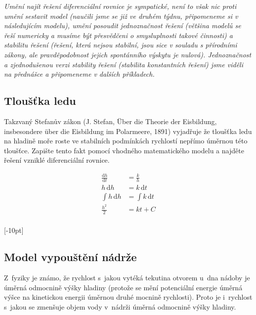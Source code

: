 \textit{Umění najít řešení diferenciální rovnice je sympatické, není to však nic proti umění sestavit model (naučili jsme se již ve druhém týdnu, připomeneme si v následujícím modelu), umění posoudit jednoznačnost řešení (většina modelů se řeší numericky a musíme být přesvědčeni o smysluplnosti takové činnosti) a  stabilitu řešení (řešení, která nejsou stabilní, jsou sice v souladu s přírodními zákony, ale pravděpodobnost jejich spontánního výskytu je nulová). Jednoznačnost a zjednodušenou verzi stability řešení (stabilita konstantních řešení) jsme viděli na přednášce a připomeneme v dalších příkladech.}

\stranka

\subsection{Tloušťka ledu}

Takzvaný Stefanův zákon (J. Stefan, \"Uber die Theorie der Eisbildung, insbesondere \"uber die Eisbildung im Polarmeere, 1891) vyjadřuje že tloušťka ledu na hladině moře roste ve
stabilních podmínkách rychlostí nepřímo úměrnou této tloušťce. Zapište
tento fakt pomocí vhodného matematického modelu a najděte řešení
vzniklé diferenciální rovnice.

\reseni

$$
\begin{aligned}
\frac{\mathrm dh}{\mathrm dt}&=\frac kh\\
h\,\mathrm dh&=k\, \mathrm dt\\
\int h\,\mathrm dh&=\int k\, \mathrm dt\\
\frac {h^2}{2}&=kt+C\\
\end{aligned}
$$



\konec 


\stranka

[-10pt]
\subsection{Model vypouštění nádrže} \label{vypousteni} Z fyziky je známo, že rychlost s jakou
vytéká tekutina otvorem u dna nádoby je úměrná odmocnině výšky hladiny
(protože se mění potenciální energie úměrná výšce na kinetickou
energii úměrnou druhé mocnině rychlosti). Proto je i rychlost s jakou
se zmenšuje objem vody v nádrži úměrná odmocnině výšky
hladiny.

